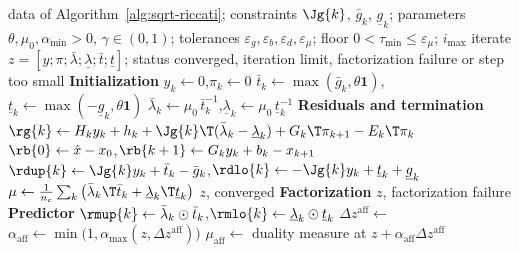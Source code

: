\begin{algorithm}[H]
\caption{Primal-dual IPM with Mehrotra's predictor-corrector}
\label{alg:ipm}
\begin{algorithmic}[1]
\Require data of Algorithm~\ref{alg:sqrt-riccati}; constraints $\Jg{k}$, $\bar{g}_k$, $\underline{g}_k$;
         parameters $\theta, \mu_0, \alpha_{\min} > 0$, $\gamma \in (0,1)$; tolerances $\varepsilon_g, \varepsilon_b, \varepsilon_d, \varepsilon_\mu$; floor $0 < \tau_{\min} \leq \varepsilon_\mu$; $i_{\max}$
\Ensure iterate $z = [y; \pi; \bar{\lambda}; \underline{\lambda}; \bar{t}; \underline{t}]$; status converged, iteration limit, factorization failure or step too small
\Statex \textbf{Initialization}
\State $y_k \gets 0$,\quad $\pi_k \gets 0$
\State $\bar{t}_k \gets \max(\bar{g}_k, \theta\mathbf{1})$,\quad $\underline{t}_k \gets \max(-\underline{g}_k, \theta\mathbf{1})$
\State $\bar{\lambda}_k \gets \mu_0\, \bar{t}_k^{-1}$,\quad $\underline{\lambda}_k \gets \mu_0\, \underline{t}_k^{-1}$
\Statex \hspace{\algorithmicindent}\textbf{Residuals and termination}
\State $\rg{k} \gets H_k y_k + h_k + \Jg{k}\T(\bar{\lambda}_k - \underline{\lambda}_k) + G_k\T \pi_{k+1} - E_k\T \pi_k$
\State $\rb{0} \gets \hat{x} - x_0$,\quad $\rb{k+1} \gets G_k y_k + b_k - x_{k+1}$
\State $\rdup{k} \gets \Jg{k} y_k + \bar{t}_k - \bar{g}_k$,\quad $\rdlo{k} \gets -\Jg{k} y_k + \underline{t}_k + \underline{g}_k$
\State $\mu \gets \frac{1}{n_c} \sum_{k} \big( \bar{\lambda}_k\T \bar{t}_k + \underline{\lambda}_k\T \underline{t}_k \big)$
\State \Return $z$, converged
\EndIf
\Statex \hspace{\algorithmicindent}\textbf{Factorization}
\State {}
\State \Return $z$, factorization failure
\EndIf
\Statex \hspace{\algorithmicindent}\textbf{Predictor}
\State $\rmup{k} \gets \bar{\lambda}_k \odot \bar{t}_k$,\quad $\rmlo{k} \gets \underline{\lambda}_k \odot \underline{t}_k$
\State $\Delta z^{\text{aff}} \gets$ 
\State $\alpha_{\text{aff}} \gets \min\big(1, \alpha_{\max}(z, \Delta z^{\text{aff}})\big)$
\State $\mu_{\text{aff}} \gets$ duality measure at $z + \alpha_{\text{aff}} \Delta z^{\text{aff}}$

\end{algorithmic}
\end{algorithm}
